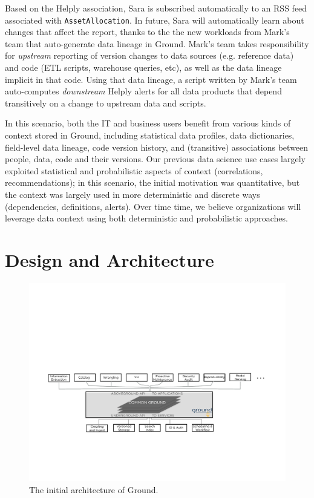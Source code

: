 \documentclass{sig-alternate}
\begin{document}
Based on the Helply association, Sara is subscribed automatically to an RSS feed associated with \texttt{AssetAllocation}. In future, Sara will automatically learn about changes that affect the report, thanks to the the new workloads from Mark's team that auto-generate data lineage in Ground. Mark's team takes responsibility for \emph{upstream} reporting of version changes to data sources (e.g. reference data) and code (ETL scripts, warehouse queries, etc), as well as the data lineage implicit in that code.
Using that data lineage, a script written by Mark's team auto-computes \emph{downstream} Helply alerts for all data products that depend transitively on a change to upstream data and scripts.

In this scenario, both the IT and business users benefit from various kinds of context stored in Ground, including statistical data profiles, data dictionaries, field-level data lineage, code version history, and (transitive) associations between people, data, code and their versions. Our previous data science use cases largely exploited statistical and probabilistic aspects of context (correlations, recommendations); in this scenario, the initial motivation was quantitative, but the context was largely used in more deterministic and discrete ways (dependencies, definitions, alerts). Over time time, we believe organizations will leverage data context using both deterministic and probabilistic approaches.

\section{Design and Architecture}
\label{sec:arch}
\begin{figure}[th]
\centering
\includegraphics[width=0.75\linewidth]{groundarch.pdf}
  \caption{The initial architecture of Ground. }
\label{fig:arch}
\end{figure}
\end{document}
